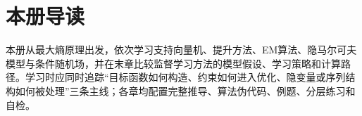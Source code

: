 \documentclass[UTF8,a4paper,11pt,openany]{ctexbook}
\begin{document}
\raggedbottom
\frontmatter
\SLMakeTitle
\chapter*{本册导读}
本册从最大熵原理出发，依次学习支持向量机、提升方法、EM算法、隐马尔可夫模型与条件随机场，并在末章比较监督学习方法的模型假设、学习策略和计算路径。学习时应同时追踪“目标函数如何构造、约束如何进入优化、隐变量或序列结构如何被处理”三条主线；各章均配置完整推导、算法伪代码、例题、分层练习和自检。
\SLPrintSourceNotice
\SLPrintContents
\mainmatter
{}







\backmatter
\SLPrintReferences
\printbookindexes
\end{document}
